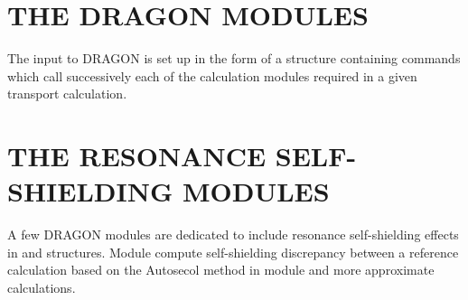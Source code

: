 \section{THE DRAGON MODULES}\label{sect:DragonModuleInput}

The input to DRAGON is set up in the form of a structure containing commands
which call successively each of the calculation modules required in a given
transport calculation.


\section{THE RESONANCE SELF-SHIELDING MODULES}\label{sect:SSModuleInput}

A few DRAGON modules are dedicated to include resonance self-shielding effects in  and
 structures. Module  compute self-shielding discrepancy between a reference
calculation based on the Autosecol method in module  and more approximate calculations.\cite{autosecol,vdg}


